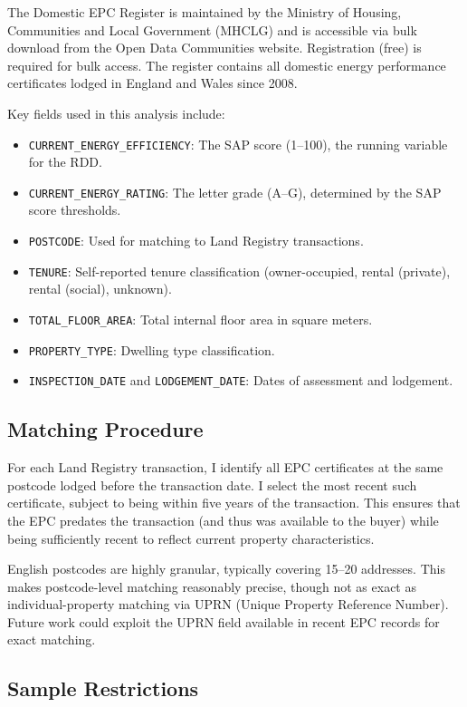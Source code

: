\documentclass[12pt]{article}
\begin{document}
The Domestic EPC Register is maintained by the Ministry of Housing, Communities and Local Government (MHCLG) and is accessible via bulk download from the Open Data Communities website. Registration (free) is required for bulk access. The register contains all domestic energy performance certificates lodged in England and Wales since 2008.

Key fields used in this analysis include:
\begin{itemize}
\item \texttt{CURRENT\_ENERGY\_EFFICIENCY}: The SAP score (1--100), the running variable for the RDD.
\item \texttt{CURRENT\_ENERGY\_RATING}: The letter grade (A--G), determined by the SAP score thresholds.
\item \texttt{POSTCODE}: Used for matching to Land Registry transactions.
\item \texttt{TENURE}: Self-reported tenure classification (owner-occupied, rental (private), rental (social), unknown).
\item \texttt{TOTAL\_FLOOR\_AREA}: Total internal floor area in square meters.
\item \texttt{PROPERTY\_TYPE}: Dwelling type classification.
\item \texttt{INSPECTION\_DATE} and \texttt{LODGEMENT\_DATE}: Dates of assessment and lodgement.
\end{itemize}

\subsection{Matching Procedure}

For each Land Registry transaction, I identify all EPC certificates at the same postcode lodged before the transaction date. I select the most recent such certificate, subject to being within five years of the transaction. This ensures that the EPC predates the transaction (and thus was available to the buyer) while being sufficiently recent to reflect current property characteristics.

English postcodes are highly granular, typically covering 15--20 addresses. This makes postcode-level matching reasonably precise, though not as exact as individual-property matching via UPRN (Unique Property Reference Number). Future work could exploit the UPRN field available in recent EPC records for exact matching.

\subsection{Sample Restrictions}
\end{document}
